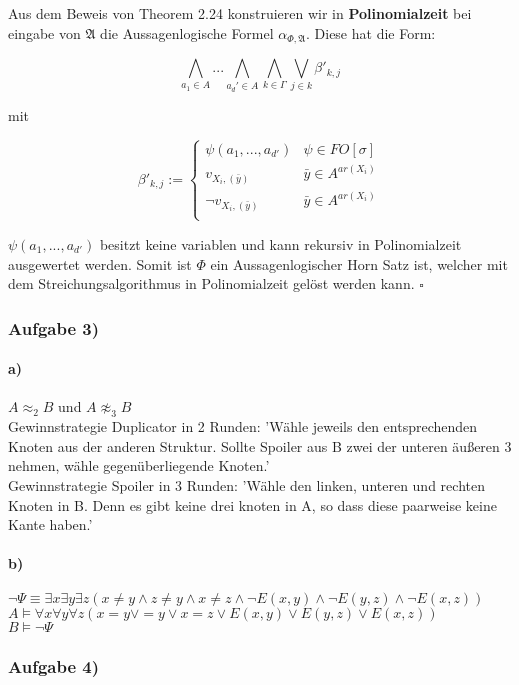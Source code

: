 \documentclass[12pt]{article}
\begin{document}
Aus dem Beweis von Theorem 2.24 konstruieren wir in \textbf{Polinomialzeit} bei eingabe von $\mathfrak{A}$ die Aussagenlogische Formel $\alpha_{\Phi,\mathfrak{A}}$. Diese hat die Form:

\[ \bigwedge_{a_1\in A}... \bigwedge_{a_d'\in A} \bigwedge_{k\in \Gamma} \bigvee_{j\in k} \beta'_{k,j} \] 

mit 

\[ \beta'_{k,j} := 
  \begin{cases}
    \psi(a_1,...,a_{d'}) & \psi\in FO[\sigma]\\
    v_{X_i,(\bar y)} & \bar y \in A^{ar(X_i)} \\
    \neg v_{X_i,(\bar y)} & \bar y \in A^{ar(X_i)} \\
  \end{cases}
\] 

$ \psi(a_1,...,a_{d'}) $ besitzt keine variablen und kann rekursiv in Polinomialzeit ausgewertet werden.
Somit ist $\Phi$ ein Aussagenlogischer Horn Satz ist, welcher mit dem Streichungsalgorithmus in Polinomialzeit gelöst werden kann.
$\square$

\subsubsection*{Aufgabe 3)}
 \paragraph{a)}
 $A \approx_2 B$ und $A \not\approx_3 B$ \\
 Gewinnstrategie Duplicator in 2 Runden: 'Wähle jeweils den entsprechenden Knoten aus der anderen Struktur. Sollte Spoiler aus B zwei der unteren äußeren 3 nehmen, wähle gegenüberliegende Knoten.'\\
 Gewinnstrategie Spoiler in 3 Runden: 'Wähle den linken, unteren und rechten Knoten in B. Denn es gibt keine drei knoten in A, so dass diese paarweise keine Kante haben.'
 
 \paragraph{b)}
 $\neg \Psi \equiv \exists x \exists y \exists z (x \neq y \land z\neq y \land x \neq z \land 
 \neg E(x,y) \land 
 \neg E(y,z) \land 
 \neg E(x,z))$ \\
 $ A \models \forall x \forall y \forall z (x = y \lor = y \lor x = z \lor 
  E(x,y) \lor 
  E(y,z) \lor 
  E(x,z))$ \\
 $ B \models \neg \Psi $

\subsubsection*{Aufgabe 4)}
\end{document}

